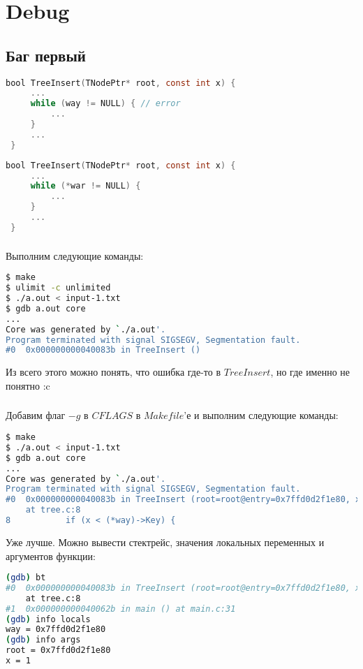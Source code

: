 \documentclass[12pt]{article}
\begin{document}
\section{Debug}
\subsection{Баг первый}
\begin{lstlisting}[language=C, backgroundcolor=\color{myred}]
 bool TreeInsert(TNodePtr* root, const int x) {
     ...
     while (way != NULL) { // error
         ...
     }
     ...
 }
\end{lstlisting}
\begin{lstlisting}[language=C, caption=tree.c, captionpos=b, backgroundcolor=\color{mygreen}]
 bool TreeInsert(TNodePtr* root, const int x) {
     ...
     while (*war != NULL) {
         ...
     }
     ...
 }
\end{lstlisting}
\subsubsection{}
Выполним следующие команды:
\begin{lstlisting}[language=bash, frame=L]
$ make
$ ulimit -c unlimited
$ ./a.out < input-1.txt
$ gdb a.out core
...
Core was generated by `./a.out'.
Program terminated with signal SIGSEGV, Segmentation fault.
#0  0x000000000040083b in TreeInsert ()
\end{lstlisting}
Из всего этого можно понять, что ошибка где-то в $TreeInsert$, но где именно не понятно :c
\subsubsection{}
Добавим флаг $-g$ в $CFLAGS$ в $Makefile$'е и выполним следующие команды:
\begin{lstlisting}[language=bash, frame=L]
$ make
$ ./a.out < input-1.txt
$ gdb a.out core
...
Core was generated by `./a.out'.
Program terminated with signal SIGSEGV, Segmentation fault.
#0  0x000000000040083b in TreeInsert (root=root@entry=0x7ffd0d2f1e80, x=1)
    at tree.c:8
8	        if (x < (*way)->Key) {
\end{lstlisting}
Уже лучше. Можно вывести стектрейс, значения локальных переменных и аргументов функции:
\begin{lstlisting}[language=bash, frame=L]
(gdb) bt
#0  0x000000000040083b in TreeInsert (root=root@entry=0x7ffd0d2f1e80, x=1)
    at tree.c:8
#1  0x000000000040062b in main () at main.c:31
(gdb) info locals
way = 0x7ffd0d2f1e80
(gdb) info args
root = 0x7ffd0d2f1e80
x = 1
\end{lstlisting}
\end{document}
